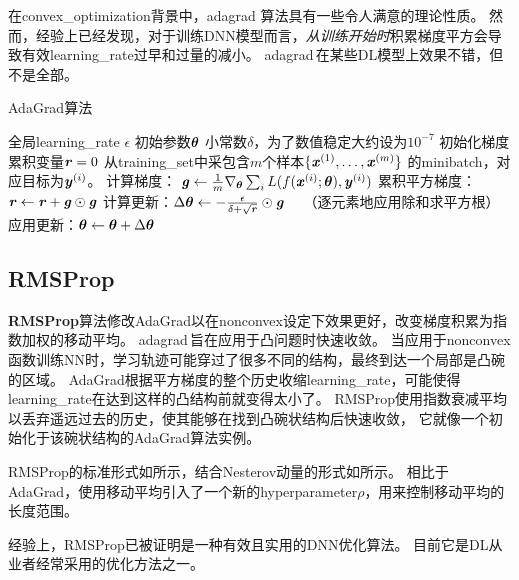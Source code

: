 在\gls{convex_optimization}背景中，\gls{adagrad} 算法具有一些令人满意的理论性质。
然而，经验上已经发现，对于训练\gls{DNN}模型而言，\emph{从训练开始时}积累梯度平方会导致有效\gls{learning_rate}过早和过量的减小。
\gls{adagrad}\,在某些\gls{DL}模型上效果不错，但不是全部。


\begin{algorithm}[ht]
\caption{AdaGrad算法}
\label{alg:ada_grad}
\begin{algorithmic}
\REQUIRE 全局\gls{learning_rate} $\epsilon$
\REQUIRE 初始参数$\boldsymbol{\theta}$
\REQUIRE 小常数$\delta$，为了数值稳定大约设为$10^{-7}$
\STATE 初始化梯度累积变量$\boldsymbol{\mathit{r}} = 0$
    \STATE 从\gls{training_set}中采包含$m$个样本$\{ \boldsymbol{\mathit{x}}^{(1)},\dots, \boldsymbol{\mathit{x}}^{(m)}\}$ 的\gls{minibatch}，对应目标为$\boldsymbol{\mathit{y}}^{(i)}$。
    \STATE 计算梯度： $\boldsymbol{\mathit{g}} \leftarrow  
         \frac{1}{m} \nabla_{\boldsymbol{\theta}} \sum_i L(f(\boldsymbol{\mathit{x}}^{(i)};\boldsymbol{\theta}),\boldsymbol{\mathit{y}}^{(i)})$ 
    \STATE 累积平方梯度：$\boldsymbol{\mathit{r}} \leftarrow \boldsymbol{\mathit{r}} + \boldsymbol{\mathit{g}} \odot \boldsymbol{\mathit{g}}$
    \STATE 计算更新：$\Delta \boldsymbol{\theta} \leftarrow -
    \frac{\epsilon}{\delta+ \sqrt{\boldsymbol{\mathit{r}}}} \odot\boldsymbol{\mathit{g}}$  \ \  （逐元素地应用除和求平方根）
    \STATE 应用更新：$\boldsymbol{\theta} \leftarrow \boldsymbol{\theta} + \Delta \boldsymbol{\theta}$
\ENDWHILE
\end{algorithmic}
\end{algorithm}


\subsection{RMSProp}
\label{sec:rmsprop}
\textbf{RMSProp}算法\citep{Hinton-ipam2012}修改AdaGrad以在\gls{nonconvex}设定下效果更好，改变梯度积累为指数加权的移动平均。
\gls{adagrad}\,旨在应用于凸问题时快速收敛。
当应用于\gls{nonconvex}函数训练\gls{NN}时，学习轨迹可能穿过了很多不同的结构，最终到达一个局部是凸碗的区域。
AdaGrad根据平方梯度的整个历史收缩\gls{learning_rate}，可能使得\gls{learning_rate}在达到这样的凸结构前就变得太小了。
RMSProp使用指数衰减平均以丢弃遥远过去的历史，使其能够在找到凸碗状结构后快速收敛，
它就像一个初始化于该碗状结构的AdaGrad算法实例。


RMSProp的标准形式如所示，结合Nesterov动量的形式如所示。
相比于AdaGrad，使用移动平均引入了一个新的\gls{hyperparameter}$\rho$，用来控制移动平均的长度范围。


经验上，RMSProp已被证明是一种有效且实用的\gls{DNN}优化算法。
目前它是\gls{DL}从业者经常采用的优化方法之一。


